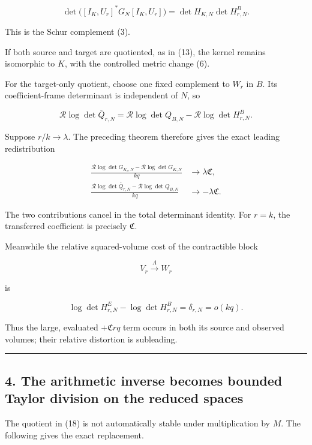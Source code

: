 \documentclass[11pt]{article}
\begin{document}
\[
\boxed{
\det\bigl([I_K,U_r]^*G_N[I_K,U_r]\bigr)
=
\det H_{K,N}\det H^B_{r,N}.
}
\tag{19}
\]

This is the Schur complement (3).

If both source and target are quotiented, as in (13), the kernel remains isomorphic to \(K\), with the controlled metric change (6).

For the target-only quotient, choose one fixed complement to \(W_r\) in \(B\). Its coefficient-frame determinant is independent of \(N\), so

\[
\boxed{
\mathcal R\log\det\overline Q_{r,N}
=
\mathcal R\log\det Q_{B,N}
-
\mathcal R\log\det H^B_{r,N}.
}
\tag{20}
\]

Suppose \(r/k\to\lambda\). The preceding theorem therefore gives the exact leading redistribution

\[
\boxed{
\begin{aligned}
\frac{\mathcal R\log\det G_{K_r,N}
-\mathcal R\log\det G_{K,N}}{kq}
&\longrightarrow\lambda\mathfrak C,\\
\frac{\mathcal R\log\det\overline Q_{r,N}
-\mathcal R\log\det Q_{B,N}}{kq}
&\longrightarrow-\lambda\mathfrak C.
\end{aligned}
}
\tag{21}
\]

The two contributions cancel in the total determinant identity. For \(r=k\), the transferred coefficient is precisely \(\mathfrak C\).

Meanwhile the relative squared-volume cost of the contractible block

\[
V_r\xrightarrow{\Lambda}W_r
\]

is

\[
\log\det H^E_{r,N}-\log\det H^B_{r,N}
=\delta_{r,N}=o(kq).
\]

Thus the large, evaluated \(+\mathfrak C rq\) term occurs in both its source and observed volumes; their relative distortion is subleading.

\begin{center}\rule{0.5\linewidth}{0.5pt}\end{center}

\subsection{4. The arithmetic inverse becomes bounded Taylor division on the reduced spaces}\label{the-arithmetic-inverse-becomes-bounded-taylor-division-on-the-reduced-spaces}

The quotient in (18) is not automatically stable under multiplication by \(M\). The following gives the exact replacement.
\end{document}
